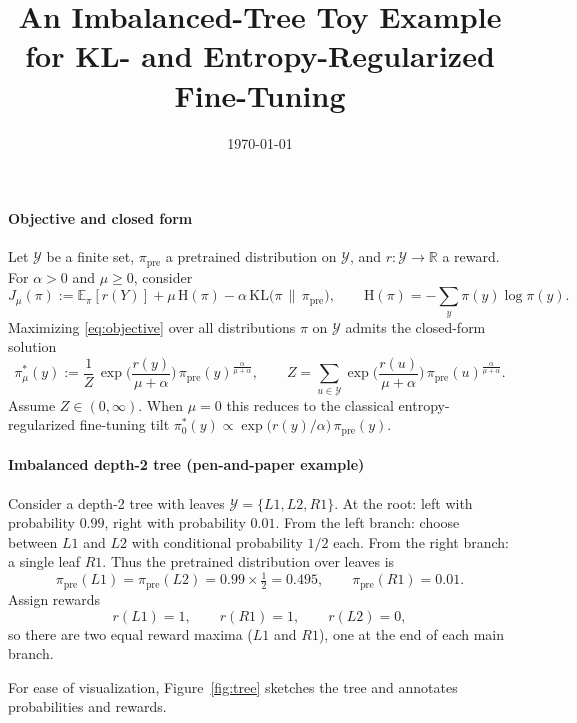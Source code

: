 \documentclass[11pt]{article}
\title{An Imbalanced-Tree Toy Example for KL- and Entropy-Regularized Fine-Tuning}
\author{}
\date{\today}
\newcommand{\E}{\mathbb{E}}
\newcommand{\KL}{\mathrm{KL}}
\newcommand{\Hent}{\mathrm{H}}
\begin{document}
\maketitle

\paragraph{Objective and closed form}
Let $\mathcal{Y}$ be a finite set, $\pi_{\mathrm{pre}}$ a pretrained distribution on $\mathcal{Y}$, and $r:\mathcal{Y}\to\mathbb{R}$ a reward. For $\alpha>0$ and $\mu\ge 0$, consider
\begin{equation}\label{eq:objective}
J_\mu(\pi)
:= \E_{\pi}[r(Y)]
   + \mu\,\Hent(\pi)
   - \alpha\,\KL\!\big(\pi \,\|\, \pi_{\mathrm{pre}}\big),
\qquad
\Hent(\pi)=-\sum_{y}\pi(y)\log \pi(y).
\end{equation}
Maximizing \eqref{eq:objective} over all distributions $\pi$ on $\mathcal{Y}$ admits the closed-form solution
\begin{equation}\label{eq:pi_star}
\pi^*_\mu(y)
:= \frac{1}{Z}\,
\exp\!\Big(\frac{r(y)}{\mu+\alpha}\Big)\,
\pi_{\mathrm{pre}}(y)^{\frac{\alpha}{\mu+\alpha}},
\qquad
Z=\sum_{u\in\mathcal{Y}}
\exp\!\Big(\frac{r(u)}{\mu+\alpha}\Big)\,
\pi_{\mathrm{pre}}(u)^{\frac{\alpha}{\mu+\alpha}}.
\end{equation}
Assume $Z\in(0,\infty)$.
When $\mu=0$ this reduces to the classical entropy-regularized fine-tuning tilt
$\pi^*_0(y)\propto \exp\big(r(y)/\alpha\big)\,\pi_{\mathrm{pre}}(y)$.

\paragraph{Imbalanced depth-2 tree (pen-and-paper example)}
Consider a depth-2 tree with leaves $\mathcal{Y}=\{L1,L2,R1\}$.
At the root:
left with probability $0.99$, right with probability $0.01$.
From the left branch: choose between $L1$ and $L2$ with conditional probability $1/2$ each.
From the right branch: a single leaf $R1$.
Thus the pretrained distribution over leaves is
\[
\pi_{\mathrm{pre}}(L1)=\pi_{\mathrm{pre}}(L2)=0.99\times\tfrac{1}{2}=0.495,
\qquad
\pi_{\mathrm{pre}}(R1)=0.01.
\]
Assign rewards
\[
r(L1)=1,\qquad r(R1)=1,\qquad r(L2)=0,
\]
so there are two equal reward maxima ($L1$ and $R1$), one at the end of each main branch.

\medskip
\noindent
For ease of visualization, Figure~\ref{fig:tree} sketches the tree and annotates probabilities and rewards.
\end{document}
